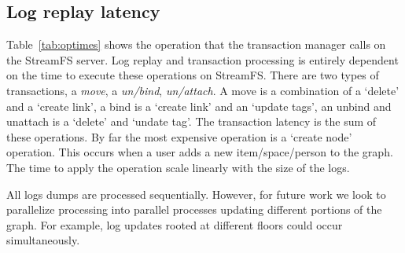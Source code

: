 \subsection{Log replay latency}
Table~\ref{tab:optimes} shows the  operation that the transaction manager calls on the StreamFS server.
Log replay and transaction processing is entirely dependent on the time to execute these operations on StreamFS.
There are two types of transactions, a \emph{move}, a \emph{un/bind}, \emph{un/attach}.  A move is a combination
of a `delete' and a `create link', a bind is a `create link' and an `update tags', an unbind and unattach is a
`delete' and `undate tag'.  The transaction latency is the sum of these operations.  By far the most expensive
operation is a `create node' operation.  This occurs when a user adds a new item/space/person to the graph.
The time to apply the operation scale linearly with the size of the logs.  

All logs dumps are processed sequentially.  However, for future work we look to parallelize processing into
parallel processes updating different portions of the graph.  For example, log updates rooted at different floors
could occur simultaneously.








